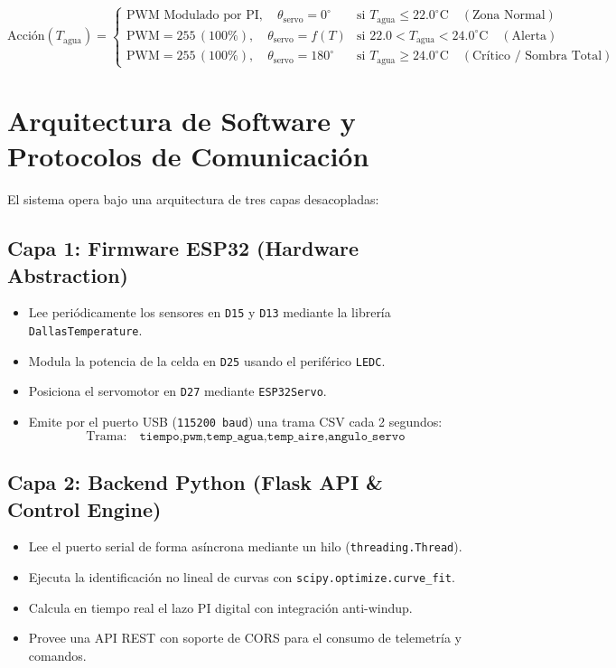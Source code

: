 \documentclass[11pt,letterpaper]{article}
\begin{document}
\begin{equation}
    \text{Acción}(T_{\text{agua}}) = 
    \begin{cases}
        \text{PWM Modulado por PI}, \quad \theta_{\text{servo}} = 0^\circ & \text{si } T_{\text{agua}} \le 22.0^\circ\text{C} \quad (\text{Zona Normal}) \\
        \text{PWM} = 255 \, (100\%), \quad \theta_{\text{servo}} = f(T) & \text{si } 22.0 < T_{\text{agua}} < 24.0^\circ\text{C} \quad (\text{Alerta}) \\
        \text{PWM} = 255 \, (100\%), \quad \theta_{\text{servo}} = 180^\circ & \text{si } T_{\text{agua}} \ge 24.0^\circ\text{C} \quad (\text{Crítico / Sombra Total})
    \end{cases}
\end{equation}

\section{Arquitectura de Software y Protocolos de Comunicación}

El sistema opera bajo una arquitectura de tres capas desacopladas:

\subsection{Capa 1: Firmware ESP32 (Hardware Abstraction)}
\begin{itemize}
    \item Lee periódicamente los sensores en \texttt{D15} y \texttt{D13} mediante la librería \texttt{DallasTemperature}.
    \item Modula la potencia de la celda en \texttt{D25} usando el periférico \texttt{LEDC}.
    \item Posiciona el servomotor en \texttt{D27} mediante \texttt{ESP32Servo}.
    \item Emite por el puerto USB (\texttt{115200 baud}) una trama CSV cada 2 segundos:
    $$\text{Trama:} \quad \texttt{tiempo,pwm,temp\_agua,temp\_aire,angulo\_servo}$$
\end{itemize}

\subsection{Capa 2: Backend Python (Flask API \& Control Engine)}
\begin{itemize}
    \item Lee el puerto serial de forma asíncrona mediante un hilo (\texttt{threading.Thread}).
    \item Ejecuta la identificación no lineal de curvas con \texttt{scipy.optimize.curve\_fit}.
    \item Calcula en tiempo real el lazo PI digital con integración anti-windup.
    \item Provee una API REST con soporte de CORS para el consumo de telemetría y comandos.
\end{itemize}
\end{document}
